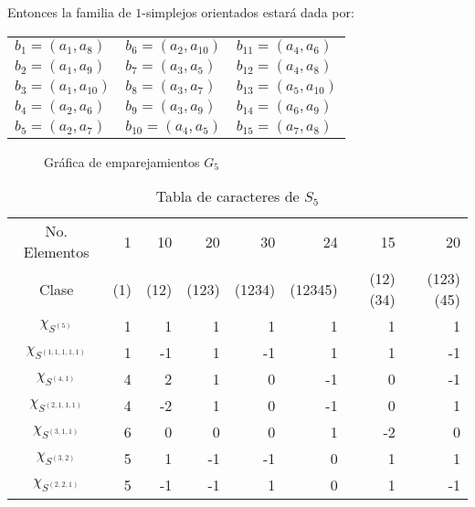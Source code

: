 \documentclass[12pt]{book}
\theoremstyle{definition}
\newcounter{in}
\begin{document}
Entonces la familia de $1$-simplejos orientados estará dada por:
\begin{center}
  \begin{tabular}[h]{lll}
    $b_{1}=(a_{1},a_{8})$ & $b_{6}=(a_{2},a_{10})$ & $b_{11}=(a_{4},a_{6})$  \\
    $b_{2}=(a_{1},a_{9})$ & $b_{7}=(a_{3},a_{5})$ & $b_{12}=(a_{4},a_{8})$  \\
    $b_{3}=(a_{1},a_{10})$ & $b_{8}=(a_{3},a_{7})$ & $b_{13}=(a_{5},a_{10})$  \\
    $b_{4}=(a_{2},a_{6})$ & $b_{9}=(a_{3},a_{9})$ & $b_{14}=(a_{6},a_{9})$  \\
    $b_{5}=(a_{2},a_{7})$ & $b_{10}=(a_{4},a_{5})$ & $b_{15}=(a_{7},a_{8})$  
  \end{tabular}
\end{center}
\begin{figure}[!hbtp]
  \centering
  
  \caption{Gráfica de emparejamientos $G_{5}$}
  \label{fig:G_5}
\end{figure}
\begin{table}[!hbtp]
  \centering
  \begin{small}
    \begin{tabular}{c |r r r r r r r}
      No. Elementos& 1 & 10 & 20 & 30 & 24 & 15 & 20  \\
      Clase & (1) & (12) & (123) & (1234) & (12345) & (12)(34) & (123)(45) \\
      \hline
      $\chi_{S^{(5)}}$       & 1 & 1 & 1 & 1 & 1 & 1 & 1 \\
      $\chi_{S^{(1,1,1,1,1)}}$ & 1 & -1 & 1 & -1 & 1 & 1 & -1\\
      $\chi_{S^{(4,1)}}$      & 4 & 2 & 1 & 0 & -1 & 0 & -1\\
      $\chi_{S^{(2,1,1,1)}}$   & 4 & -2 & 1 & 0 & -1 & 0 & 1 \\
      $\chi_{S^{(3,1,1)}}$    & 6 & 0 & 0 & 0 & 1 & -2 & 0 \\
      $\chi_{S^{(3,2)}}$     & 5 & 1 & -1 & -1 & 0 & 1 & 1 \\
      $\chi_{S^{(2,2,1)}}$   & 5 & -1 & -1 & 1 & 0 & 1 & -1 
    \end{tabular}
  \end{small}

  \caption{Tabla de caracteres de $S_{5}$}
  \label{tab:S_5}
\end{table}
\end{document}
